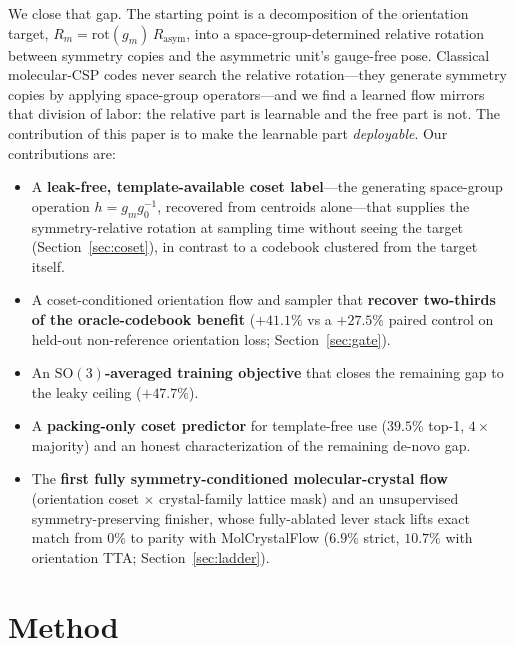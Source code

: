 \documentclass[10pt]{article}
\begin{document}
We close that gap. The starting point is a decomposition of the orientation
target, $R_m=\mathrm{rot}(g_m)\,R_{\text{asym}}$, into a space-group-determined
relative rotation between symmetry copies and the asymmetric unit's gauge-free
pose. Classical molecular-CSP codes never search the relative rotation---they
generate symmetry copies by applying space-group
operators\cite{price2023blindtest7,obrien2021dataefficient}---and we find a
learned flow mirrors that division of labor: the relative part is learnable and
the free part is not. The contribution of this paper is to make the learnable
part \emph{deployable}. Our contributions are:
\begin{itemize}\itemsep0.05em
\item A \textbf{leak-free, template-available coset label}---the generating
space-group operation $h=g_m g_0^{-1}$, recovered from centroids alone---that
supplies the symmetry-relative rotation at sampling time without seeing the
target (Section~\ref{sec:coset}), in contrast to a codebook clustered from the
target itself.
\item A coset-conditioned orientation flow and sampler that \textbf{recover
two-thirds of the oracle-codebook benefit} ($+41.1\%$ vs a $+27.5\%$ paired
control on held-out non-reference orientation loss; Section~\ref{sec:gate}).
\item An \textbf{$\mathrm{SO}(3)$-averaged training objective}\cite{cao2025so3averaged}
that closes the remaining gap to the leaky ceiling ($+47.7\%$).
\item A \textbf{packing-only coset predictor} for template-free use ($39.5\%$
top-1, $4\times$ majority) and an honest characterization of the remaining
de-novo gap.
\item The \textbf{first fully symmetry-conditioned molecular-crystal flow}
(orientation coset $\times$ crystal-family lattice mask) and an unsupervised
symmetry-preserving finisher, whose fully-ablated lever stack lifts exact match
from $0\%$ to parity with MolCrystalFlow ($6.9\%$ strict, $10.7\%$ with
orientation TTA; Section~\ref{sec:ladder}).
\end{itemize}

\section{Method}
\end{document}
